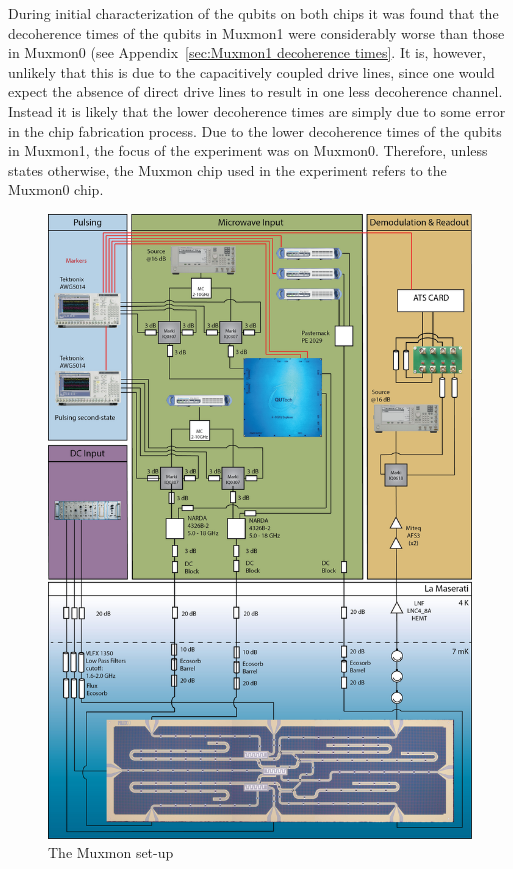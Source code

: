       During initial characterization of the qubits on both chips it was found that the decoherence times of the qubits in Muxmon1 were considerably worse than those in Muxmon0 (see Appendix~\ref{sec:Muxmon1 decoherence times}. It is, however, unlikely that this is due to the capacitively coupled drive lines, since one would expect the absence of direct drive lines to result in one less decoherence channel. Instead it is likely that the lower decoherence times are simply due to some error in the chip fabrication process. Due to the lower decoherence times of the qubits in Muxmon1, the focus of the experiment was on Muxmon0. Therefore, unless states otherwise, the Muxmon chip used in the experiment refers to the Muxmon0 chip.

      \begin{figure}[tb]
        \centering
        \includegraphics[width=.9\textwidth]{../Figures/20150512_Muxmon_Setup.jpg}
        \caption{The Muxmon set-up}
        \label{fig:Muxmon set-up}
      \end{figure}

